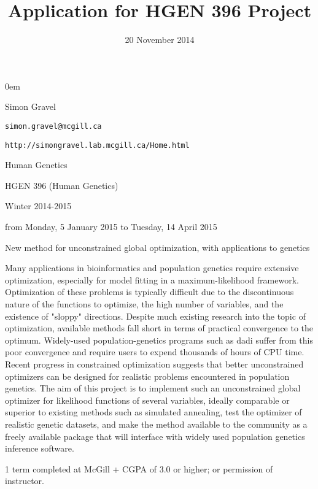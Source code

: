 \documentclass[12pt]{article}
\title{\vspace{-3em}Application for HGEN 396 Project}
\author{}
\date{\vspace{-3em}20 November 2014}
\begin{document}
\maketitle

\begin{description}
    \itemsep0em
    \item[Supervisor's Name] Simon Gravel
    \item[Supervisor's Email] \texttt{simon.gravel@mcgill.ca}
    \item[Supervisor's Phone]
    \item[Supervisor's Website] \texttt{http://simongravel.lab.mcgill.ca/Home.html}
    \item[Supervisor's department] Human Genetics
    \item[Course number] HGEN 396 (Human Genetics)
    \item[Term] Winter 2014-2015
    \item[Project Duration] from Monday, 5 January 2015 to Tuesday, 14 April 2015
    \item[Project title] New method for unconstrained global optimization, with applications to genetics
    \item[Project description] Many applications in bioinformatics and population genetics require extensive optimization, especially for model fitting in a maximum-likelihood framework. Optimization of these problems is typically difficult due to the discontinuous nature of the functions to optimize, the high number of variables, and the existence of "sloppy" directions. Despite much existing research into the topic of optimization, available methods fall short in terms of practical convergence to the optimum. Widely-used population-genetics programs such as dadi suffer from this poor convergence and require users to expend thousands of hours of CPU time. Recent progress in constrained optimization suggests that better unconstrained optimizers can be designed for realistic problems encountered in population genetics. The aim of this project is to implement such an unconstrained global optimizer for likelihood functions of several variables, ideally comparable or superior to existing methods such as simulated annealing, test the optimizer of realistic genetic datasets, and make the method available to the community as a freely available package that will interface with widely used population genetics inference software.
    \item[Prerequisite] 1 term completed at McGill + CGPA of 3.0 or higher; or permission of instructor.

\end{description}
\end{document}
